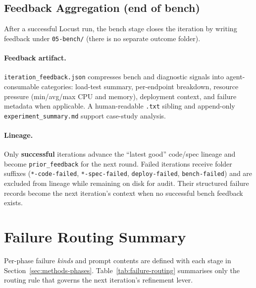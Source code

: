 \subsection{Feedback Aggregation (end of bench)}
\label{sec:methods-outcome}

After a successful Locust run, the bench stage closes the iteration by writing
feedback under \texttt{05-bench/} (there is no separate outcome folder).

\paragraph{Feedback artifact.}
\texttt{iteration\_feedback.json} compresses bench and diagnostic signals into
agent-consumable categories: load-test summary, per-endpoint breakdown,
resource pressure (min/avg/max CPU and memory), deployment context, and
failure metadata when applicable.  A human-readable \texttt{.txt} sibling and
append-only \texttt{experiment\_summary.md} support case-study analysis.

\paragraph{Lineage.}
Only \textbf{successful} iterations advance the ``latest good'' code/spec
lineage and become \texttt{prior\_feedback} for the next round.  Failed
iterations receive folder suffixes (\texttt{*-code-failed},
\texttt{*-spec-failed}, \texttt{deploy-failed}, \texttt{bench-failed}) and are
excluded from lineage while remaining on disk for audit.  Their structured
failure records become the next iteration's context when no successful bench
feedback exists.


\section{Failure Routing Summary}
\label{sec:methods-failure}

Per-phase failure \emph{kinds} and prompt contents are defined with each stage
in Section~\ref{sec:methods-phases}.  Table~\ref{tab:failure-routing}
summarises only the routing rule that governs the next iteration's refinement
lever.

